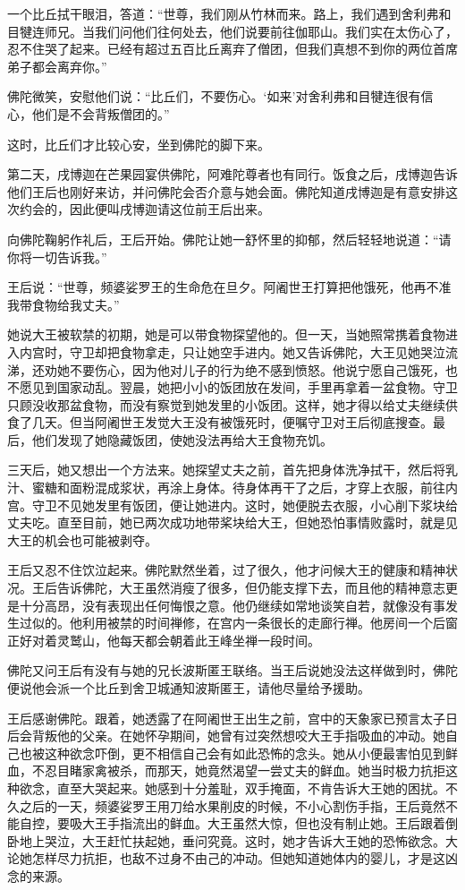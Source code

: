 \documentclass[12pt,twoside,openany]{book}
\begin{document}
一个比丘拭干眼泪，答道：“世尊，我们刚从竹林而来。路上，我们遇到舍利弗和目犍连师兄。当我们问他们往何处去，他们说要前往伽耶山。我们实在太伤心了，忍不住哭了起来。已经有超过五百比丘离弃了僧团，但我们真想不到你的两位首席弟子都会离弃你。”

佛陀微笑，安慰他们说：“比丘们，不要伤心。‘如来’对舍利弗和目犍连很有信心，他们是不会背叛僧团的。”

这时，比丘们才比较心安，坐到佛陀的脚下来。

第二天，戌博迦在芒果园宴供佛陀，阿难陀尊者也有同行。饭食之后，戌博迦告诉他们王后也刚好来访，并问佛陀会否介意与她会面。佛陀知道戌博迦是有意安排这次约会的，因此便叫戌博迦请这位前王后出来。

向佛陀鞠躬作礼后，王后开始。佛陀让她一舒怀里的抑郁，然后轻轻地说道：“请你将一切告诉我。”

王后说：“世尊，频婆娑罗王的生命危在旦夕。阿阇世王打算把他饿死，他再不准我带食物给我丈夫。”

她说大王被软禁的初期，她是可以带食物探望他的。但一天，当她照常携着食物进入内宫时，守卫却把食物拿走，只让她空手进内。她又告诉佛陀，大王见她哭泣流涕，还劝她不要伤心，因为他对儿子的行为绝不感到愤怒。他说宁愿自己饿死，也不愿见到国家动乱。翌晨，她把小小的饭团放在发间，手里再拿着一盆食物。守卫只顾没收那盆食物，而没有察觉到她发里的小饭团。这样，她才得以给丈夫继续供食了几天。但当阿阇世王发觉大王没有被饿死时，便嘱守卫对王后彻底搜查。最后，他们发现了她隐藏饭团，使她没法再给大王食物充饥。

三天后，她又想出一个方法来。她探望丈夫之前，首先把身体洗净拭干，然后将乳汁、蜜糖和面粉混成浆状，再涂上身体。待身体再干了之后，才穿上衣服，前往内宫。守卫不见她发里有饭团，便让她进内。这时，她便脱去衣服，小心削下浆块给丈夫吃。直至目前，她已两次成功地带桨块给大王，但她恐怕事情败露时，就是见大王的机会也可能被剥夺。

王后又忍不住饮泣起来。佛陀默然坐着，过了很久，他才问候大王的健康和精神状况。王后告诉佛陀，大王虽然消瘦了很多，但仍能支撑下去，而且他的精神意志更是十分高昂，没有表现出任何悔恨之意。他仍继续如常地谈笑自若，就像没有事发生过似的。他利用被禁的时间禅修，在宫内一条很长的走廊行禅。他房间一个后窗正好对着灵鹫山，他每天都会朝着此王峰坐禅一段时间。

佛陀又问王后有没有与她的兄长波斯匿王联络。当王后说她没法这样做到时，佛陀便说他会派一个比丘到舍卫城通知波斯匿王，请他尽量给予援助。

王后感谢佛陀。跟着，她透露了在阿阇世王出生之前，宫中的天象家已预言太子日后会背叛他的父亲。在她怀孕期间，她曾有过突然想咬大王手指吸血的冲动。她自己也被这种欲念吓倒，更不相信自己会有如此恐怖的念头。她从小便最害怕见到鲜血，不忍目睹家禽被杀，而那天，她竟然渴望一尝丈夫的鲜血。她当时极力抗拒这种欲念，直至大哭起来。她感到十分羞耻，双手掩面，不肯告诉大王她的困扰。不久之后的一天，频婆娑罗王用刀给水果削皮的时候，不小心割伤手指，王后竟然不能自控，要吸大王手指流出的鲜血。大王虽然大惊，但也没有制止她。王后跟着倒卧地上哭泣，大王赶忙扶起她，垂问究竟。这时，她才告诉大王她的恐怖欲念。大论她怎样尽力抗拒，也敌不过身不由己的冲动。但她知道她体内的婴儿，才是这凶念的来源。
\end{document}

